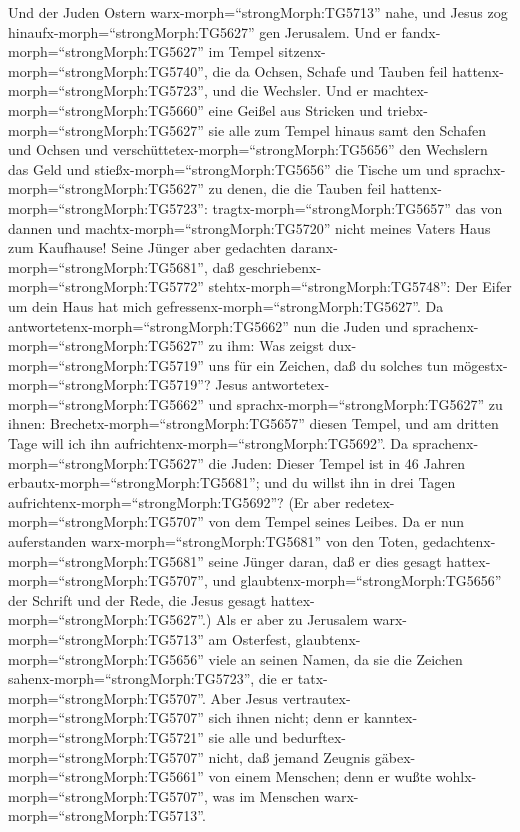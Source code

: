  Und der Juden Ostern warx-morph=``strongMorph:TG5713''
nahe, und Jesus zog hinaufx-morph=``strongMorph:TG5627'' gen Jerusalem.
 Und er fandx-morph=``strongMorph:TG5627'' im Tempel
sitzenx-morph=``strongMorph:TG5740'', die da Ochsen, Schafe und Tauben
feil hattenx-morph=``strongMorph:TG5723'', und die Wechsler.
 Und er machtex-morph=``strongMorph:TG5660'' eine Geißel
aus Stricken und triebx-morph=``strongMorph:TG5627'' sie alle zum Tempel
hinaus samt den Schafen und Ochsen und
verschüttetex-morph=``strongMorph:TG5656'' den Wechslern das Geld und
stießx-morph=``strongMorph:TG5656'' die Tische um  und
sprachx-morph=``strongMorph:TG5627'' zu denen, die die Tauben feil
hattenx-morph=``strongMorph:TG5723'':
tragtx-morph=``strongMorph:TG5657'' das von dannen und
machtx-morph=``strongMorph:TG5720'' nicht meines Vaters Haus zum
Kaufhause!  Seine Jünger aber gedachten
daranx-morph=``strongMorph:TG5681'', daß
geschriebenx-morph=``strongMorph:TG5772''
stehtx-morph=``strongMorph:TG5748'': Der Eifer um dein Haus hat mich
gefressenx-morph=``strongMorph:TG5627''.  Da
antwortetenx-morph=``strongMorph:TG5662'' nun die Juden und
sprachenx-morph=``strongMorph:TG5627'' zu ihm: Was zeigst
dux-morph=``strongMorph:TG5719'' uns für ein Zeichen, daß du solches tun
mögestx-morph=``strongMorph:TG5719''?  Jesus
antwortetex-morph=``strongMorph:TG5662'' und
sprachx-morph=``strongMorph:TG5627'' zu ihnen:
Brechetx-morph=``strongMorph:TG5657'' diesen Tempel, und am dritten Tage
will ich ihn aufrichtenx-morph=``strongMorph:TG5692''.  Da
sprachenx-morph=``strongMorph:TG5627'' die Juden: Dieser Tempel ist in
46 Jahren erbautx-morph=``strongMorph:TG5681''; und du willst ihn in
drei Tagen aufrichtenx-morph=``strongMorph:TG5692''?  (Er
aber redetex-morph=``strongMorph:TG5707'' von dem Tempel seines Leibes.
 Da er nun auferstanden warx-morph=``strongMorph:TG5681''
von den Toten, gedachtenx-morph=``strongMorph:TG5681'' seine Jünger
daran, daß er dies gesagt hattex-morph=``strongMorph:TG5707'', und
glaubtenx-morph=``strongMorph:TG5656'' der Schrift und der Rede, die
Jesus gesagt hattex-morph=``strongMorph:TG5627''.)  Als er
aber zu Jerusalem warx-morph=``strongMorph:TG5713'' am Osterfest,
glaubtenx-morph=``strongMorph:TG5656'' viele an seinen Namen, da sie die
Zeichen sahenx-morph=``strongMorph:TG5723'', die er
tatx-morph=``strongMorph:TG5707''.  Aber Jesus
vertrautex-morph=``strongMorph:TG5707'' sich ihnen nicht; denn er
kanntex-morph=``strongMorph:TG5721'' sie alle  und
bedurftex-morph=``strongMorph:TG5707'' nicht, daß jemand Zeugnis
gäbex-morph=``strongMorph:TG5661'' von einem Menschen; denn er wußte
wohlx-morph=``strongMorph:TG5707'', was im Menschen
warx-morph=``strongMorph:TG5713''.

